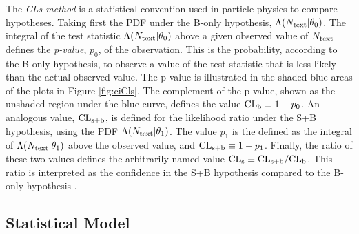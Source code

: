 

The \emph{CLs method} is a statistical convention used in particle physics to compare hypotheses.
Taking first the PDF under the B-only hypothesis, $\Lambda(N_\mathrm{text}|\theta_0)$.
The integral of the test statistic $\Lambda(N_\mathrm{text}|\theta_0)$ above a given observed value of $N_\mathrm{text}$ defines the \emph{p-value}, $p_0$, of the observation.
This is the probability, according to the B-only hypothesis, to observe a value of the test statistic that is less likely than the actual observed value.
The p-value is illustrated in the shaded blue areas of the plots in Figure \ref{fig:ciCls}.
The complement of the p-value, shown as the unshaded region under the blue curve, defines the value $\text{CL}_\text{b}\equiv1-p_0$.
An analogous value, $\text{CL}_\text{s+b}$, is defined for the likelihood ratio under the S+B hypothesis, using the PDF $\Lambda(N_\mathrm{text}|\theta_1)$.
The value $p_1$ is the defined as the integral of $\Lambda(N_\mathrm{text}|\theta_1)$ above the observed value, and $\text{CL}_\text{s+b}\equiv1-p_1$.
Finally, the ratio of these two values defines the arbitrarily named value $\text{CL}_\text{s}\equiv \text{CL}_\text{s+b}/\text{CL}_\text{b}$.
This ratio is interpreted as the confidence in the S+B hypothesis compared to the B-only hypothesis \cite{read}.

\subsection{Statistical Model}\label{sec:ciStatModel}


